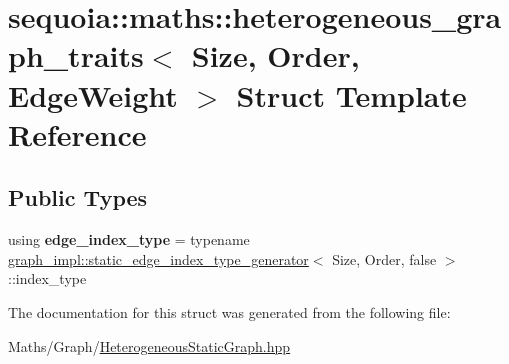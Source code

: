 \hypertarget{structsequoia_1_1maths_1_1heterogeneous__graph__traits}{}\section{sequoia\+::maths\+::heterogeneous\+\_\+graph\+\_\+traits$<$ Size, Order, Edge\+Weight $>$ Struct Template Reference}
\label{structsequoia_1_1maths_1_1heterogeneous__graph__traits}
\subsection*{Public Types}
\begin{DoxyCompactItemize}
\item 
\mbox{\label{structsequoia_1_1maths_1_1heterogeneous__graph__traits_a85516aac5a00943d33b05b7a9ce858d7}} 
using {\bfseries edge\+\_\+index\+\_\+type} = typename \mbox{\hyperlink{structsequoia_1_1maths_1_1graph__impl_1_1static__edge__index__type__generator}{graph\+\_\+impl\+::static\+\_\+edge\+\_\+index\+\_\+type\+\_\+generator}}$<$ Size, Order, false $>$\+::index\+\_\+type
\end{DoxyCompactItemize}


The documentation for this struct was generated from the following file\+:\begin{DoxyCompactItemize}
\item 
Maths/\+Graph/\mbox{\hyperlink{_heterogeneous_static_graph_8hpp}{Heterogeneous\+Static\+Graph.\+hpp}}\end{DoxyCompactItemize}
